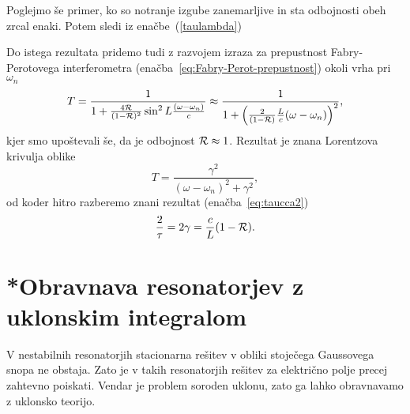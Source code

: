 Poglejmo še primer, ko so notranje izgube zanemarljive in sta odbojnosti obeh zrcal enaki.
Potem sledi iz enačbe~(\ref{taulambda})

Do istega rezultata pridemo tudi z razvojem izraza za prepustnost Fabry-Perotovega 
interferometra (enačba~\ref{eq:Fabry-Perot-prepustnost})
okoli vrha pri $\omega_{n}$
\begin{equation}
T=\frac{1}{1+\frac{4{\cal R}}{(1-{\cal R})^{2}}\sin^{2}L\frac{(\omega-\omega_{n})}{c}}\approx 
\frac{1}{1+\left(\frac{2}{(1-{\cal R})}\frac{L}{c}(\omega-\omega_{n})\right)^{2}},
\label{3.27}
\end{equation}
 kjer smo upoštevali še, da je odbojnost ${\cal R} \approx 1$. Rezultat je znana Lorentzova
 krivulja oblike
 \begin{equation}
 T = \frac{\gamma^2}{(\omega - \omega_n)^2+\gamma^2},
 \label{eq:FBi2}
 \end{equation}
od koder hitro razberemo znani rezultat (enačba~\ref{eq:taucca2})
\begin{equation}
\frac{2}{\tau}=2\gamma = \frac{c}{L}(1-{\cal R}).
\end{equation}

\section{*Obravnava resonatorjev z uklonskim integralom}
\label{Resonator_uklon}

V nestabilnih resonatorjih stacionarna rešitev v obliki stoječega
Gaussovega snopa ne obstaja. Zato je v takih resonatorjih rešitev za električno polje precej
zahtevno poiskati. Vendar je problem soroden uklonu, zato ga lahko obravnavamo z 
uklonsko teorijo.

